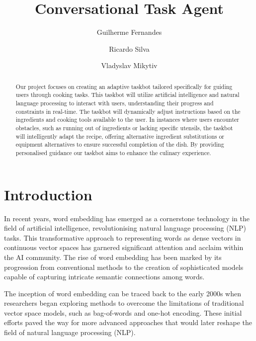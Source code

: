 \documentclass[runningheads]{llncs}
\begin{document}
%
\title{Conversational Task Agent}
%
%
\author{Guilherme Fernandes \and
Ricardo Silva \and
Vladyslav Mikytiv}
%
%
%
\maketitle              %
%
\begin{abstract}
Our project focuses on creating an adaptive taskbot tailored specifically for guiding users through cooking tasks. This taskbot will utilize artificial intelligence and natural language processing to interact with users, understanding their progress and constraints in real-time. The taskbot will dynamically adjust instructions based on the ingredients and cooking tools available to the user. In instances where users encounter obstacles, such as running out of ingredients or lacking specific utensils, the taskbot will intelligently adapt the recipe, offering alternative ingredient substitutions or equipment alternatives to ensure successful completion of the dish. By providing personalised guidance our taskbot aims to enhance the culinary experience.

\end{abstract}
%
%
%
\section{Introduction}
In recent years, word embedding has emerged as a cornerstone technology in the field of artificial intelligence, revolutionising natural language processing (NLP) tasks. This transformative approach to representing words as dense vectors in continuous vector spaces has garnered significant attention and acclaim within the AI community. The rise of word embedding has been marked by its progression from conventional methods to the creation of sophisticated models capable of capturing intricate semantic connections among words.

The inception of word embedding can be traced back to the early 2000s when researchers began exploring methods to overcome the limitations of traditional vector space models, such as bag-of-words and one-hot encoding. These initial efforts paved the way for more advanced approaches that would later reshape the field of natural language processing (NLP).
\end{document}
